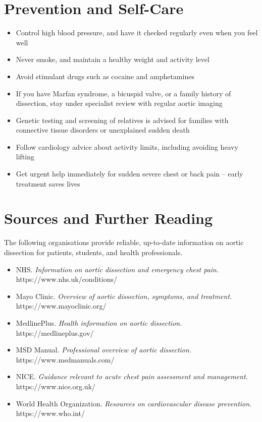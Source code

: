 \section*{Prevention and Self-Care}
\begin{itemize}
    \item Control high blood pressure, and have it checked regularly even when you feel well
    \item Never smoke, and maintain a healthy weight and activity level
    \item Avoid stimulant drugs such as cocaine and amphetamines
    \item If you have Marfan syndrome, a bicuspid valve, or a family history of dissection, stay under specialist review with regular aortic imaging
    \item Genetic testing and screening of relatives is advised for families with connective tissue disorders or unexplained sudden death
    \item Follow cardiology advice about activity limits, including avoiding heavy lifting
    \item Get urgent help immediately for sudden severe chest or back pain -- early treatment saves lives
\end{itemize}

\section*{Sources and Further Reading}
The following organisations provide reliable, up-to-date information on aortic dissection for patients, students, and health professionals.

\begin{itemize}
    \item NHS. \textit{Information on aortic dissection and emergency chest pain.} https://www.nhs.uk/conditions/
    \item Mayo Clinic. \textit{Overview of aortic dissection, symptoms, and treatment.} https://www.mayoclinic.org/
    \item MedlinePlus. \textit{Health information on aortic dissection.} https://medlineplus.gov/
    \item MSD Manual. \textit{Professional overview of aortic dissection.} https://www.msdmanuals.com/
    \item NICE. \textit{Guidance relevant to acute chest pain assessment and management.} https://www.nice.org.uk/
    \item World Health Organization. \textit{Resources on cardiovascular disease prevention.} https://www.who.int/
\end{itemize}
